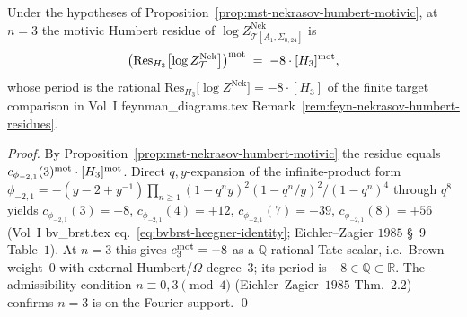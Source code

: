\begin{corollary}[$c_3 = -8$ at $H_3$: explicit verification;
\ClaimStatusConditional]
\label{cor:mst-nekrasov-c3-H3}
Under the hypotheses of
Proposition~\ref{prop:mst-nekrasov-humbert-motivic}, at $n = 3$ the
motivic Humbert residue of
$\log Z^{\mathrm{Nek}}_{\mathcal T[A_1,\Sigma_{0,24}]}$ is
\[
 \bigl(\mathrm{Res}_{H_3}\bigl[\log Z^{\mathrm{Nek}}_{\mathcal T}\bigr]\bigr)^{\mathrm{mot}}
 \;=\; -8\cdot [H_3]^{\mathrm{mot}},
\]
whose period is the rational
$\mathrm{Res}_{H_3}\bigl[\log Z^{\mathrm{Nek}}\bigr] = -8\cdot [H_3]$
of the finite target comparison in Vol~I feynman\_diagrams.tex
Remark~\ref{rem:feyn-nekrasov-humbert-residues}.

\emph{Proof.} By Proposition~\ref{prop:mst-nekrasov-humbert-motivic}
the residue equals $c_{\phi_{-2,1}}(3)^{\mathrm{mot}}\cdot [H_3]^{\mathrm{mot}}$.
Direct $q, y$-expansion of the infinite-product form
$\phi_{-2,1} = -(y - 2 + y^{-1})\prod_{n\geq 1}(1 - q^n y)^2
(1 - q^n/y)^2/(1-q^n)^4$ through $q^8$ yields
$c_{\phi_{-2,1}}(3) = -8$, $c_{\phi_{-2,1}}(4) = +12$,
$c_{\phi_{-2,1}}(7) = -39$, $c_{\phi_{-2,1}}(8) = +56$ (Vol~I
bv\_brst.tex eq.~\eqref{eq:bvbrst-heegner-identity}; Eichler--Zagier
$1985$ \S~$9$ Table~$1$). At $n = 3$ this gives $c_3^{\mathrm{mot}} = -8$
as a $\mathbb Q$-rational Tate scalar, i.e.\ Brown weight~$0$ with
external Humbert/$\Omega$-degree~$3$; its period is
$-8 \in \mathbb Q\subset \mathbb R$. The admissibility condition
$n\equiv 0, 3\pmod 4$ (Eichler--Zagier~$1985$ Thm.~$2.2$) confirms
$n = 3$ is on the Fourier support. \qed
\end{corollary}

